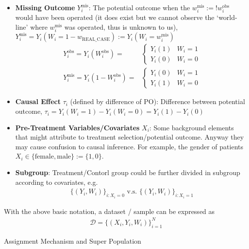 \begin{itemize}[topsep=2pt,itemsep=0pt]
        \item \textbf{Missing Outcome} $ Y_i^{\mathrm{mis} } $: The potential outcome when the $ w_i^\mathrm{mis}:= !w_i^\mathrm{obs}  $ would have been operated (it does exist but we cannot observe the `world-line' where $ w^{\mathrm{mis} }_i $ was operated, thus is unknown to us), $ Y_i^{\mathrm{mis} }=Y_i(W_i=1-w_\mathrm{REAL\_CASE}):=Y_i(W_i=w_i^{\mathrm{mis} }) $ 
        \begin{align*}
            Y^\mathrm{obs} _i=Y_i(W_i^\mathrm{obs} )=&\begin{cases}
                Y_i(1)&W_i=1\\
                Y_i(0)&W_i=0
            \end{cases}\\
            Y^{\mathrm{mis} }_i=Y_i(1-W_i^\mathrm{obs} )=&\begin{cases}
                Y_i(0)&W_i=1\\
                Y_i(1)&W_i=0
            \end{cases}
        \end{align*}
        \item \textbf{Causal Effect} $ \tau_i $ (defined by difference of PO): Difference between potential outcome, $ \tau_i=Y_i(W_i=1)-Y_i(W_i=0)=Y_i(1)-Y_i(0) $
        \item \textbf{Pre-Treatment Variables/Covariates} $ X_i $: Some background elements that might attribute to treatment selection/potential outcome. Anyway they may cause confusion to causal inference. For example, the gender of patients $ X_i\in\{\mathrm{female}, \mathrm{male}  \}:=\{1,0\} $.
        \item \textbf{Subgroup}: Treatment/Contorl group could be further divided in subgroup according to covariates, e.g.
        \begin{align*}
            \{(Y_i,W_i)\}_{i:X_i=0}\text{ v.s. }  \{(Y_i,W_i)\}_{i:X_i=1}
        \end{align*}
    \end{itemize}

    With the above basic notation, a dataset / sample can be expressed as
    \begin{align*}
        \mathcal{D}=\{(X_i,Y_i,W_i)\}_{i=1}^N 
    \end{align*}
    

\begin{point}
    Assignment Mechanism and Super Population
\end{point}

